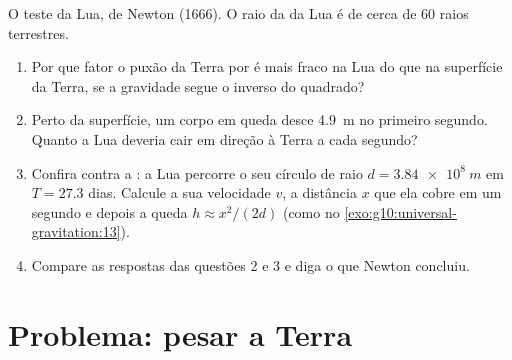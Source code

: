 \begin{exercise}[$\star\star\star$]\label{exo:g10:universal-gravitation:15}
O teste da Lua, de Newton (1666). O raio da  da Lua é de cerca de
$60$ raios terrestres.
\begin{enumerate}
  \item Por que fator o puxão da Terra por  é mais fraco na Lua
        do que na superfície da Terra, se a gravidade segue o inverso do
        quadrado?
  \item Perto da superfície, um corpo em queda desce \qty{4.9}{m} no
        primeiro segundo. Quanto a Lua deveria cair em direção à Terra a
        cada segundo?
  \item Confira contra a : a Lua percorre o seu círculo de raio
        $d = \qty{3.84e8}{m}$ em $T = 27.3$ dias. Calcule a sua
        velocidade $v$, a distância $x$ que ela cobre em um segundo e
        depois a queda $h \approx x^2/(2d)$ (como no
        \cref{exo:g10:universal-gravitation:13}).
  \item Compare as respostas das questões 2 e 3 e diga o que Newton
        concluiu.
\end{enumerate}
\end{exercise}

\section{Problema: pesar a Terra}

